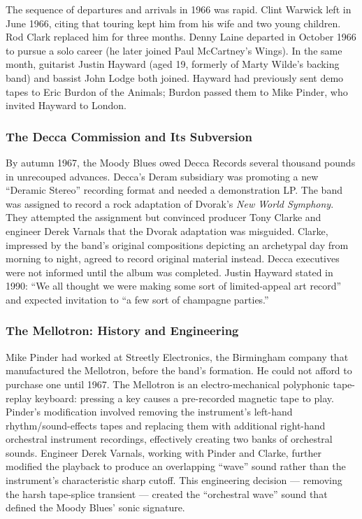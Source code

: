 \documentclass[11pt,letterpaper]{article}
\begin{document}
The sequence of departures and arrivals in 1966 was rapid. Clint Warwick left in June 1966, citing that touring kept him from his wife and two young children. Rod Clark replaced him for three months. Denny Laine departed in October 1966 to pursue a solo career (he later joined Paul McCartney's Wings). In the same month, guitarist Justin Hayward (aged 19, formerly of Marty Wilde's backing band) and bassist John Lodge both joined. Hayward had previously sent demo tapes to Eric Burdon of the Animals; Burdon passed them to Mike Pinder, who invited Hayward to London.

\subsubsection{The Decca Commission and Its Subversion}

By autumn 1967, the Moody Blues owed Decca Records several thousand pounds in unrecouped advances. Decca's Deram subsidiary was promoting a new ``Deramic Stereo'' recording format and needed a demonstration LP. The band was assigned to record a rock adaptation of Dvorak's \textit{New World Symphony}. They attempted the assignment but convinced producer Tony Clarke and engineer Derek Varnals that the Dvorak adaptation was misguided. Clarke, impressed by the band's original compositions depicting an archetypal day from morning to night, agreed to record original material instead. Decca executives were not informed until the album was completed. Justin Hayward stated in 1990: ``We all thought we were making some sort of limited-appeal art record'' and expected invitation to ``a few sort of champagne parties.''

\subsubsection{The Mellotron: History and Engineering}

Mike Pinder had worked at Streetly Electronics, the Birmingham company that manufactured the Mellotron, before the band's formation. He could not afford to purchase one until 1967. The Mellotron is an electro-mechanical polyphonic tape-replay keyboard: pressing a key causes a pre-recorded magnetic tape to play. Pinder's modification involved removing the instrument's left-hand rhythm/sound-effects tapes and replacing them with additional right-hand orchestral instrument recordings, effectively creating two banks of orchestral sounds. Engineer Derek Varnals, working with Pinder and Clarke, further modified the playback to produce an overlapping ``wave'' sound rather than the instrument's characteristic sharp cutoff. This engineering decision --- removing the harsh tape-splice transient --- created the ``orchestral wave'' sound that defined the Moody Blues' sonic signature.
\end{document}
